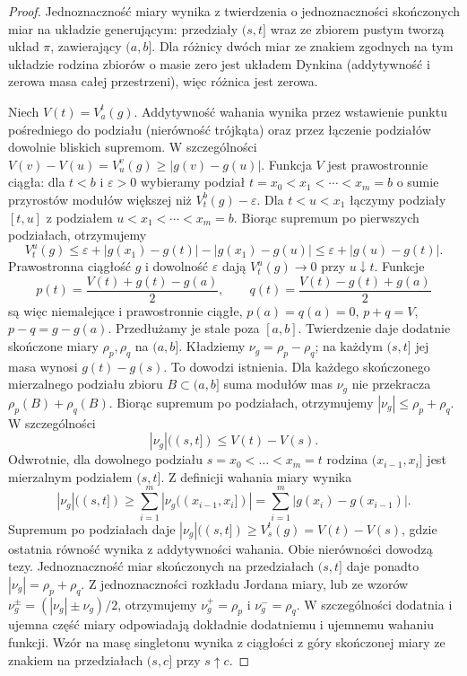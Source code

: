 \begin{proof}
Jednoznaczność miary wynika z twierdzenia o jednoznaczności
skończonych miar na układzie generującym: przedziały $(s,t]$
wraz ze zbiorem pustym tworzą układ $\pi$, zawierający $(a,b]$.
Dla różnicy dwóch miar ze znakiem zgodnych na tym układzie
rodzina zbiorów o masie zero jest układem Dynkina
(addytywność i zerowa masa całej przestrzeni), więc różnica
jest zerowa.

Niech $V(t)=V_a^t(g)$. Addytywność wahania wynika przez
wstawienie punktu pośredniego do podziału (nierówność trójkąta)
oraz przez łączenie podziałów dowolnie bliskich supremom.
W szczególności $V(v)-V(u)=V_u^v(g)\ge|g(v)-g(u)|$.
Funkcja $V$ jest prawostronnie ciągła: dla $t<b$ i $\varepsilon>0$
wybieramy podział $t=x_0<x_1<\cdots<x_m=b$ o sumie przyrostów
modułów większej niż $V_t^b(g)-\varepsilon$.
Dla $t<u<x_1$ łączymy podziały $[t,u]$ z podziałem
$u<x_1<\cdots<x_m=b$. Biorąc supremum po pierwszych podziałach,
otrzymujemy
\[
 V_t^u(g)\le\varepsilon+|g(x_1)-g(t)|-|g(x_1)-g(u)|
 \le\varepsilon+|g(u)-g(t)|.
\]
Prawostronna ciągłość $g$ i dowolność $\varepsilon$ dają
$V_t^u(g)\to0$ przy $u\downarrow t$.
Funkcje
\[
 p(t)=\frac{V(t)+g(t)-g(a)}2,\qquad
 q(t)=\frac{V(t)-g(t)+g(a)}2
\]
są więc niemalejące i prawostronnie ciągłe, $p(a)=q(a)=0$,
$p+q=V$, $p-q=g-g(a)$. Przedłużamy je stale poza $[a,b]$.
Twierdzenie 
daje dodatnie skończone miary $\rho_p,\rho_q$ na $(a,b]$.
Kładziemy $\nu_g=\rho_p-\rho_q$; na każdym $(s,t]$
jej masa wynosi $g(t)-g(s)$. To dowodzi istnienia.
Dla każdego skończonego mierzalnego podziału
zbioru $B\subset(a,b]$ suma modułów mas
$\nu_g$ nie przekracza $\rho_p(B)+\rho_q(B)$.
Biorąc supremum po podziałach, otrzymujemy
$|\nu_g|\le\rho_p+\rho_q$. W szczególności
\[
 |\nu_g|((s,t])\le V(t)-V(s).
\]
Odwrotnie, dla dowolnego podziału
$s=x_0<\dots<x_m=t$ rodzina $(x_{i-1},x_i]$
jest mierzalnym podziałem $(s,t]$. Z definicji
wahania miary wynika
\[
 |\nu_g|((s,t])\ge
 \sum_{i=1}^m|\nu_g((x_{i-1},x_i])|
 =\sum_{i=1}^m|g(x_i)-g(x_{i-1})|.
\]
Supremum po podziałach daje
$|\nu_g|((s,t])\ge V_s^t(g)=V(t)-V(s)$,
gdzie ostatnia równość wynika z addytywności
wahania. Obie nierówności dowodzą tezy.
Jednoznaczność miar skończonych na przedziałach
$(s,t]$ daje ponadto $|\nu_g|=\rho_p+\rho_q$.
Z jednoznaczności rozkładu Jordana miary, lub
ze wzorów $\nu_g^\pm=(|\nu_g|\pm\nu_g)/2$,
otrzymujemy $\nu_g^+=\rho_p$ i $\nu_g^-=\rho_q$.
W szczególności dodatnia i ujemna część miary
odpowiadają dokładnie dodatniemu i ujemnemu
wahaniu funkcji. Wzór na masę singletonu wynika z ciągłości z góry
skończonej miary ze znakiem na przedziałach $(s,c]$
przy $s\uparrow c$.


\end{proof}
